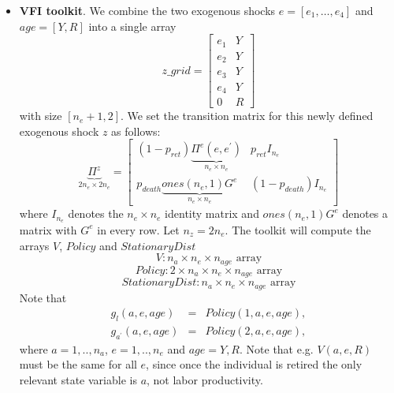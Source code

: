 \documentclass[12pt]{article}
\begin{document}
\begin{itemize}
\item \textbf{VFI toolkit}. We combine the two exogenous shocks $e=\left[
e_{1},\ldots ,e_{4}\right] $ and $age=[Y,R]$ into a single array%
\begin{equation*}
z\_grid=%
\begin{bmatrix}
e_{1} & Y \\ 
e_{2} & Y \\ 
e_{3} & Y \\ 
e_{4} & Y \\ 
0 & R%
\end{bmatrix}%
\end{equation*}
with size $[n_{e}+1,2]$. We set the transition matrix for this newly defined
exogenous shock $z$ as follows:%
\begin{equation*}
\underbrace{\Pi ^{z}}_{2n_{e}\times 2n_{e}}=%
\begin{bmatrix}
\left( 1-p_{ret}\right) \underbrace{\Pi ^{e}(e,e^{\prime })}_{n_{e}\times
n_{e}} & p_{ret}I_{n_{e}} \\ 
p_{death}\underbrace{ones(n_{e},1)G^{e}}_{n_{e}\times n_{e}} & \left(
1-p_{death}\right) I_{n_{e}}%
\end{bmatrix}%
\end{equation*}%
where $I_{n_{e}}$ denotes the $n_{e}\times n_{e}$ identity matrix and $%
ones(n_{e},1)G^{e}$ denotes a matrix with $G^{e}$ in every row. Let $%
n_{z}=2n_{e}$. The toolkit will compute the arrays $V$, $Policy$ and $%
StationaryDist$%
\begin{equation*}
V:n_{a}\times n_{e}\times n_{age}\text{ array}
\end{equation*}%
\begin{equation*}
Policy:2\times n_{a}\times n_{e}\times n_{age}\text{ array}
\end{equation*}%
\begin{equation*}
StationaryDist:n_{a}\times n_{e}\times n_{age}\text{ array}
\end{equation*}%
Note that 
\begin{eqnarray*}
g_{l}(a,e,age) &=&Policy(1,a,e,age), \\
g_{a^{\prime }}(a,e,age) &=&Policy(2,a,e,age),
\end{eqnarray*}%
where $a=1,..,n_{a}$, $e=1,..,n_{e}$ and $age=Y,R$. Note that e.g. $V(a,e,R)$
must be the same for all $e$, since once the individual is retired the only
relevant state variable is $a$, not labor productivity.
\end{itemize}
\end{document}

